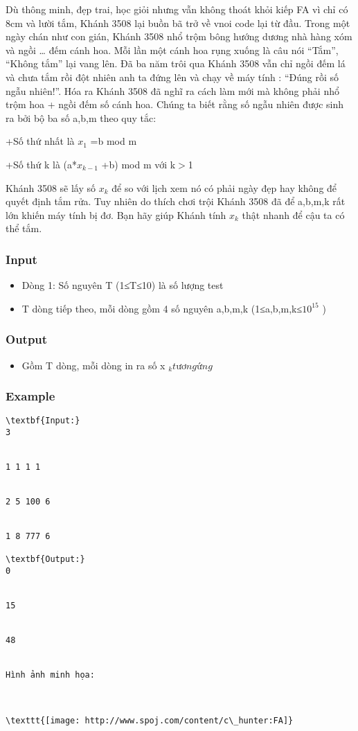 



   Dù thông minh, đẹp trai, học giỏi nhưng vẫn không thoát khỏi kiếp FA vì chỉ có 8cm và lười tắm, Khánh 3508 lại buồn bã trở về vnoi code lại từ đầu. Trong một ngày chán như con gián, Khánh 3508 nhổ trộm bông hướng dương nhà hàng xóm và ngồi … đếm cánh hoa. Mỗi lần một cánh hoa rụng xuống là câu nói “Tắm”, “Không tắm” lại vang lên. Đã ba năm trôi qua Khánh 3508 vẫn chỉ ngồi đếm lá và chưa tắm rồi đột nhiên anh ta đứng lên và chạy về máy tính : “Đúng rồi số ngẫu nhiên!”. Hóa ra Khánh 3508 đã nghĩ ra cách làm mới mà không phải nhổ trộm hoa + ngồi đếm số cánh hoa. Chúng ta biết rằng số ngẫu nhiên được sinh ra bởi bộ ba số a,b,m theo quy tắc:  

   +Số thứ nhất là $x_{1}$   =b mod m  

   +Số thứ k là (a*$x_{k-1}$   +b) mod m với k$>$1  

   Khánh 3508 sẽ lấy số $x_{k}$   để so với lịch xem nó có phải ngày đẹp hay không để quyết định tắm rửa. Tuy nhiên do thích chơi trội Khánh 3508 đã để a,b,m,k rất lớn khiến máy tính bị đơ. Bạn hãy giúp Khánh tính $x_{k}$   thật nhanh để cậu ta có thể tắm.  

\subsubsection{   Input  }
\begin{itemize}
	\item     Dòng 1: Số nguyên T (1≤T≤10) là số lượng test   
	\item     T dòng tiếp theo, mỗi dòng gồm 4 số nguyên a,b,m,k (1≤a,b,m,k≤$10^{15}$    )   
\end{itemize}

\subsubsection{   Output  }
\begin{itemize}
	\item     Gồm T dòng, mỗi dòng in ra số x    $_     k tương ứng     


$
\end{itemize}

\subsubsection{   Example  }
\begin{verbatim}
\textbf{Input:}
3


1 1 1 1


2 5 100 6


1 8 777 6

\textbf{Output:}
0


15


48


Hình ảnh minh họa:



\texttt{[image: http://www.spoj.com/content/c\_hunter:FA]} 


\end{verbatim}
